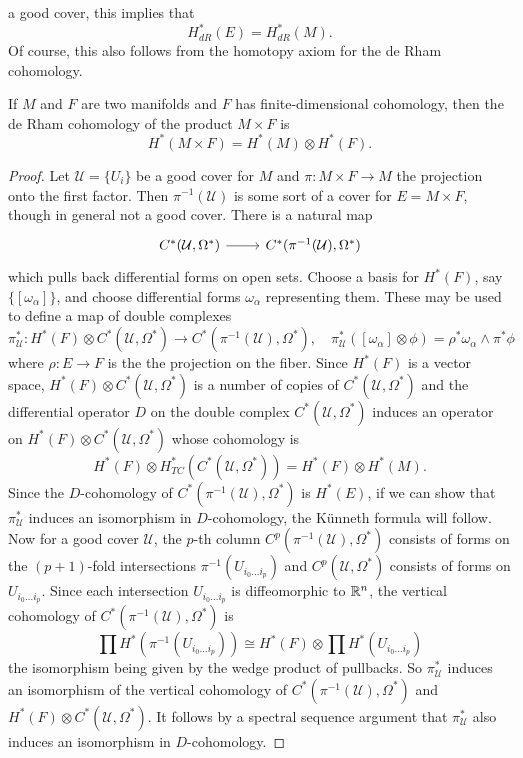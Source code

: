 a good cover, this implies that
\[H^*_{dR}(E)=H^*_{dR}(M).\]
Of course, this also follows from the homotopy axiom for the de Rham cohomology.
\begin{proposition}
If $M$ and $F$ are two manifolds and $F$ has finite-dimensional cohomology, then the de Rham cohomology of the product $M\times F$ is
\[H^*(M\times F)=H^*(M)\otimes H^*(F).\]
\end{proposition}
\begin{proof}
Let $\mathcal{U}=\{U_i\}$ be a good cover for $M$ and $\pi:M\times F\to M$ the projection onto the first factor. Then $\pi^{-1}(\mathcal{U})$ is some sort of a cover for 
$E=M\times F$, though in general not a good cover. There is a natural map
\[\begin{tikzcd}
C^*(\mathcal{U},\Omega^*)\ar[r]&C^*(\pi^{-1}(\mathcal{U}),\Omega^*)
\end{tikzcd}\]
which pulls back differential forms on open sets. Choose a basis for $H^*(F)$, say $\{[\omega_\alpha]\}$, and choose differential forms $\omega_\alpha$ representing them. 
These may be used to define a map of double complexes
\[\pi^*_{\mathcal{U}}:H^*(F)\otimes C^*(\mathcal{U},\Omega^*)\to C^*(\pi^{-1}(\mathcal{U}),\Omega^*),\quad \pi^*_{\mathcal{U}}([\omega_\alpha]\otimes\phi)=\rho^*\omega_\alpha\wedge\pi^*\phi\]
where $\rho:E\to F$ is the the projection on the fiber. Since $H^*(F)$ is a vector space, $H^*(F)\otimes C^*(\mathcal{U},\Omega^*)$ is a number of copies of $C^*(\mathcal{U},\Omega^*)$ 
and the differential operator $D$ on the double complex $C^*(\mathcal{U},\Omega^*)$ induces an operator on $H^*(F)\otimes C^*(\mathcal{U},\Omega^*)$ whose cohomology is
\[H^*(F)\otimes H_{TC}^*(C^*(\mathcal{U},\Omega^*))=H^*(F)\otimes H^*(M).\]
Since the $D$-cohomology of $C^*(\pi^{-1}(\mathcal{U}),\Omega^*)$ is $H^*(E)$, if we can show that $\pi^*_{\mathcal{U}}$ induces an isomorphism in $D$-cohomology, the 
K\"unneth formula will follow. Now for a good cover $\mathcal{U}$, the $p$-th column $C^p(\pi^{-1}(\mathcal{U}),\Omega^*)$ consists of forms on the $(p+1)$-fold 
intersections $\pi^{-1}(U_{i_0\dots i_p})$ and $C^p(\mathcal{U},\Omega^*)$ consists of forms on $U_{i_0\dots i_p}$. Since each intersection $U_{i_0\dots i_p}$ is 
diffeomorphic to $\mathbb{R}^n$, the vertical cohomology of $C^*(\pi^{-1}(\mathcal{U}),\Omega^*)$ is
\[\prod H^*(\pi^{-1}(U_{i_0\dots i_p}))\cong H^*(F)\otimes\prod H^*(U_{i_0\dots i_p})\]
the isomorphism being given by the wedge product of pullbacks. So $\pi^*_{\mathcal{U}}$ induces an isomorphism of the vertical cohomology of $C^*(\pi^{-1}(\mathcal{U}),\Omega^*)$ 
and $H^*(F)\otimes C^*(\mathcal{U},\Omega^*)$. It follows by a spectral sequence argument that $\pi_{\mathcal{U}}^*$ also induces an isomorphism in $D$-cohomology. 
\end{proof}
